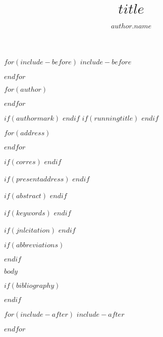 \documentclass[AMA,STIX1COL$for(classoption)$,$classoption$$endfor$]{WileyNJD-v5}
\begin{document}
$for(include-before)$
$include-before$

$endfor$

\title{$title$}

$for(author)$
\author[$author.num$]{$author.name$}
$endfor$

$if(authormark)$
$endif$
$if(runningtitle)$
$endif$


$for(address)$
\address[$address.num$]{$address.org$}
$endfor$

$if(corres)$
$endif$

$if(presentaddress)$
$endif$

$if(abstract)$
$endif$

$if(keywords)$
$endif$

$if(jnlcitation)$ 
$endif$

\maketitle

$if(abbreviations)$ 
\renewcommand\thefootnote{}

\renewcommand\thefootnote{\fnsymbol{footnote}}
\setcounter{footnote}{1}
$endif$

$body$

$if(bibliography)$

$endif$

$for(include-after)$
$include-after$

$endfor$
\end{document}
